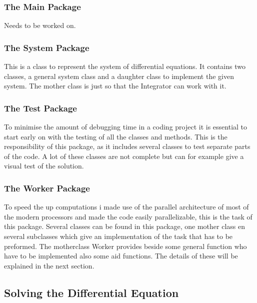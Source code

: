 \subsubsection{The Main Package}
Needs to be worked on.

\subsubsection{The System Package}

This is a class to represent the system of differential equations. 
It contains two classes, a general system class and a daughter class to implement the given system.
The mother class is just so that the Integrator can work with it.

\subsubsection{The Test Package}

To minimise the amount of debugging time in a coding project it is essential to start early on with the testing of all the classes and methods.
This is the responsibility of this package, as it includes several classes to test separate parts of the code.
A lot of these classes are not complete but can for example give a visual test of the solution.

\subsubsection{The Worker Package}

To speed the up computations i made use of the parallel architecture of most of the modern processors and made the code easily parallelizable, this is the task of this package.
Several classes can be found in this package, one mother class en several subclasses which give an implementation of the task that has to be preformed.
The motherclass Worker provides beside some general function who have to be implemented also some aid functions.
The details of these will be explained in the next section.

\subsection{Solving the Differential Equation}

